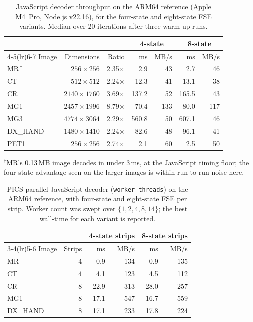 \documentclass[journal]{IEEEtran}
\begin{document}
\begin{table}[htbp]
\centering
\caption{JavaScript decoder throughput on the ARM64 reference (Apple
M4~Pro, Node.js v22.16), for the four-state and eight-state FSE
variants. Median over 20 iterations after three warm-up runs.}
\label{tab:js-perf}
\begin{tabular}{lrrrrrr}
\toprule
 & & & \multicolumn{2}{c}{4-state} & \multicolumn{2}{c}{8-state} \\
\cmidrule(lr){4-5}\cmidrule(lr){6-7}
Image & Dimensions & Ratio & ms & MB/s & ms & MB/s \\
\midrule
MR\,$^\dagger$ & $256{\times}256$   & 2.35$\times$ &   2.9 &  43 &   2.7 &  46 \\
CT  & $512{\times}512$   & 2.24$\times$ &  12.3 &  41 &  13.1 &  38 \\
CR  & $2140{\times}1760$ & 3.69$\times$ & 137.2 &  52 & 165.5 &  43 \\
MG1 & $2457{\times}1996$ & 8.79$\times$ &  70.4 & 133 &  80.0 & 117 \\
MG3 & $4774{\times}3064$ & 2.29$\times$ & 560.8 &  50 & 607.1 &  46 \\
DX\_HAND & $1480{\times}1410$ & 2.24$\times$ &  82.6 &  48 &  96.1 &  41 \\
PET1 & $256{\times}256$   & 2.74$\times$ &   2.1 &  60 &   2.5 &  50 \\
\bottomrule
\end{tabular}

\vspace{2pt}
{\scriptsize $^\dagger$MR's 0.13\,MB image decodes in under 3\,ms, at the
JavaScript timing floor; the four-state advantage seen on the larger images
is within run-to-run noise here.}
\end{table}

\begin{table}[htbp]
\centering
\caption{PICS parallel JavaScript decoder (\texttt{worker\_threads}) on
the ARM64 reference, with four-state and eight-state FSE per strip.
Worker count was swept over $\{1,2,4,8,14\}$; the best wall-time for
each variant is reported.}
\label{tab:pics-js}
\begin{tabular}{lrrrrr}
\toprule
 & & \multicolumn{2}{c}{4-state strips} & \multicolumn{2}{c}{8-state strips} \\
\cmidrule(lr){3-4}\cmidrule(lr){5-6}
Image & Strips &   ms & MB/s &   ms & MB/s \\
\midrule
MR  & 4 &   0.9 & 134 &   0.9 & 135 \\
CT  & 4 &   4.1 & 123 &   4.5 & 112 \\
CR  & 8 &  22.9 & 313 &  28.0 & 257 \\
MG1 & 8 &  17.1 & 547 &  16.7 & 559 \\
DX\_HAND & 8 &  17.1 & 233 &  17.8 & 224 \\
\bottomrule
\end{tabular}
\end{table}
\end{document}
